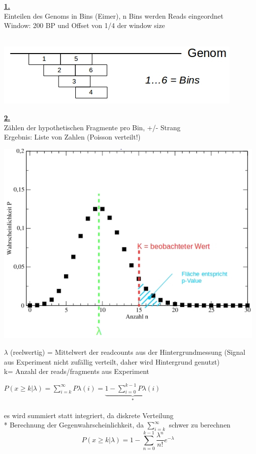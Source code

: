 \textbf{\underline{1. }}\\
Einteilen des Genoms in Bins (Eimer), n Bins werden Reads eingeordnet\\
Window: 200 BP und Offset von 1/4 der window size\\\\
\begin{center}
\includegraphics[scale=0.5]{lectures/160415/pix/sign.jpg}
\end{center}
\textbf{\underline{2. }}\\
Zählen der hypothetischen Fragmente pro Bin, +/- Strang\\
Ergebnis: Liste von Zahlen (Poisson verteilt!)
\begin{center}
\includegraphics[scale=0.5]{lectures/160415/pix/poisson.jpg}
\end{center}
$\lambda$ (reelwertig) = Mittelwert der readcounts aus der Hintergrundmessung (Signal aus Experiment nicht zufällig verteilt, daher wird Hintergrund genutzt)\\
k= Anzahl der reads/fragments aus Experiment

$P(x \geq k|\lambda)=\sum \limits_{i=k}^{\infty}P\lambda(i)=\underbrace{1-\sum \limits_{i=0}^{k-1}P\lambda(i)}_{*}$
\\\\
es wird summiert statt integriert, da diskrete Verteilung\\
* Berechnung der Gegenwahrscheinlichkeit, da $\sum \limits_{i=k}^{\infty}$ schwer zu berechnen
\begin{equation}
P(x \geq k|\lambda)=1-\sum \limits_{n=0}^{k-1}\frac{\lambda^{n}}{n!}e^{-\lambda}
\end{equation}

